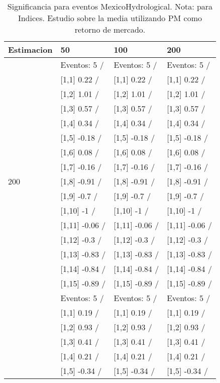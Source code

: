 \begin{table}

\caption{Significancia para eventos MexicoHydrological. Nota: para Indices. Estudio sobre la media utilizando PM como retorno de mercado.}
\centering
\begin{tabular}[t]{llll}
\toprule
Estimacion & 50 & 100 & 200\\
\midrule
 & Eventos:  5 / & Eventos:  5 / & Eventos:  5 /\\
 & {}[1,1] 0.22  / & {}[1,1] 0.22  / & {}[1,1] 0.22  /\\
 & {}[1,2] 1.01  / & {}[1,2] 1.01  / & {}[1,2] 1.01  /\\
 & {}[1,3] 0.57  / & {}[1,3] 0.57  / & {}[1,3] 0.57  /\\
 & {}[1,4] 0.34  / & {}[1,4] 0.34  / & {}[1,4] 0.34  /\\
\addlinespace
 & {}[1,5] -0.18  / & {}[1,5] -0.18  / & {}[1,5] -0.18  /\\
 & {}[1,6] 0.08  / & {}[1,6] 0.08  / & {}[1,6] 0.08  /\\
 & {}[1,7] -0.16  / & {}[1,7] -0.16  / & {}[1,7] -0.16  /\\
200 & {}[1,8] -0.91  / & {}[1,8] -0.91  / & {}[1,8] -0.91  /\\
 & {}[1,9] -0.7  / & {}[1,9] -0.7  / & {}[1,9] -0.7  /\\
\addlinespace
 & {}[1,10] -1  / & {}[1,10] -1  / & {}[1,10] -1  /\\
 & {}[1,11] -0.06  / & {}[1,11] -0.06  / & {}[1,11] -0.06  /\\
 & {}[1,12] -0.3  / & {}[1,12] -0.3  / & {}[1,12] -0.3  /\\
 & {}[1,13] -0.83  / & {}[1,13] -0.83  / & {}[1,13] -0.83  /\\
 & {}[1,14] -0.84  / & {}[1,14] -0.84  / & {}[1,14] -0.84  /\\
\addlinespace
 & {}[1,15] -0.89  / & {}[1,15] -0.89  / & {}[1,15] -0.89  /\\
 & Eventos:  5 / & Eventos:  5 / & Eventos:  5 /\\
 & {}[1,1] 0.19  / & {}[1,1] 0.19  / & {}[1,1] 0.19  /\\
 & {}[1,2] 0.93  / & {}[1,2] 0.93  / & {}[1,2] 0.93  /\\
 & {}[1,3] 0.41  / & {}[1,3] 0.41  / & {}[1,3] 0.41  /\\
\addlinespace
 & {}[1,4] 0.21  / & {}[1,4] 0.21  / & {}[1,4] 0.21  /\\
 & {}[1,5] -0.34  / & {}[1,5] -0.34  / & {}[1,5] -0.34  /\\

\end{tabular}
\end{table}
